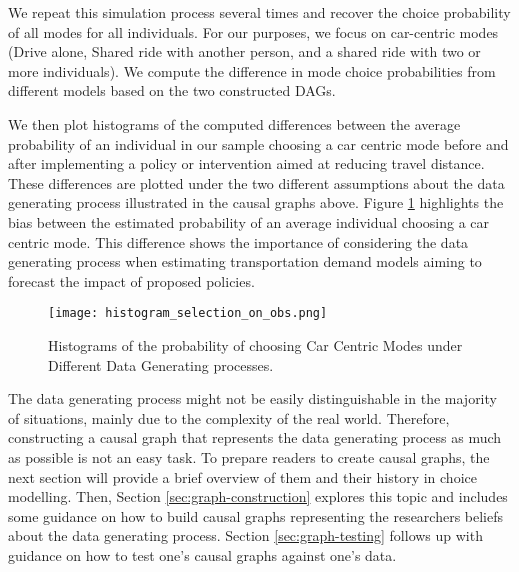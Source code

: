 We repeat this simulation process several times and recover the choice probability of all modes for all individuals.
For our purposes, we focus on car-centric modes (Drive alone, Shared ride with another person, 
and a shared ride with two or more individuals).
We compute the difference in mode choice probabilities from different models based on the two constructed DAGs.



We then plot histograms of the computed differences between the average probability of an individual
in our sample choosing a car centric mode before and after implementing a policy or intervention
aimed at reducing travel distance.
These differences are plotted under the two different assumptions about the data generating process illustrated in the causal graphs above.
Figure \ref{fig:histogram_probability} highlights the bias between the estimated probability of an average individual choosing a car centric mode.
This difference shows the importance of considering the data generating process when estimating transportation demand models aiming to forecast the impact of proposed policies.

\begin{figure}
   \centering
   \texttt{[image: histogram\_selection\_on\_obs.png]}
   \caption{Histograms of the probability of choosing Car Centric Modes under Different Data Generating processes.}
   \label{fig:histogram_probability}
\end{figure}

The data generating process might not be easily distinguishable in the majority of situations, mainly due to the complexity of the real world.
Therefore, constructing a causal graph that represents the data generating process as much as possible is not an easy task.
To prepare readers to create causal graphs, the next section will provide a brief overview of them and their history in choice modelling.
Then, Section \ref{sec:graph-construction} explores this topic and includes some guidance on how to build causal graphs representing the researchers beliefs about the data generating process.
Section \ref{sec:graph-testing} follows up with guidance on how to test one's causal graphs against one's data.